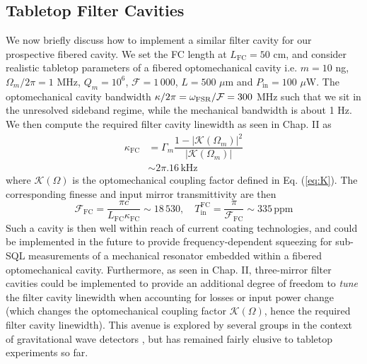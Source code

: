 \subsection{Tabletop Filter Cavities}

We now briefly discuss how to implement a similar filter cavity for our prospective fibered cavity. We set the FC length at $L_{\mathrm{FC}} = 50$ cm, and consider realistic tabletop parameters of a fibered optomechanical cavity i.e. $m=10$ ng, $\Omega_m/2\pi = 1$ MHz, $Q_m = 10^6$, $\mathcal{F}=1\,000$, $L=500$ $\mu$m and $P_\mathrm{in} = 100$ $\mu$W. The optomechanical cavity bandwidth $\kappa/2\pi = \omega_{\rm{FSR}}/\mathcal{F}= 300$ MHz such that we sit in the unresolved sideband regime, while the mechanical bandwidth is about 1 Hz. We then compute the required filter cavity linewidth as seen in Chap. II as 
\begin{equation}
\begin{split}
\kappa_{\mathrm{FC}} & = \Gamma_m \dfrac{1 - |\mathcal{K}(\Omega_m)|^2}{|\mathcal{K}(\Omega_m)|}\\ 
& \sim 2 \pi . 16 \, \mathrm{kHz}
\end{split}
\end{equation}
where $\mathcal{K}(\Omega)$ is the optomechanical coupling factor defined in Eq. (\ref{eq:K}). The corresponding finesse and input mirror transmittivity are then
\begin{equation}
 \mathcal{F}_{\mathrm{FC}} = \dfrac{\pi c}{L_{\mathrm{FC}} \kappa_{\mathrm{FC}}} \sim 18\,530, \quad T^{\mathrm{FC}}_{\mathrm{in}} = \dfrac{\pi}{\mathcal{F}_{\mathrm{FC}}} \sim 335 \,\mathrm{ppm}
\end{equation}
Such a cavity is then well within reach of current coating technologies, and could be implemented in the future to provide frequency-dependent squeezing for sub-SQL measurements of a mechanical resonator embedded within a fibered optomechanical cavity. Furthermore, as seen in Chap. II, three-mirror filter cavities could be implemented to provide an additional degree of freedom to \textit{tune} the filter cavity linewidth when accounting for losses or input power change (which changes the optomechanical coupling factor $\mathcal{K}(\Omega)$, hence the required filter cavity linewidth). This avenue is explored by several groups in the context of gravitational wave detectors \cite{stevens,ding2025}, but has remained fairly elusive to tabletop experiments so far. \\

